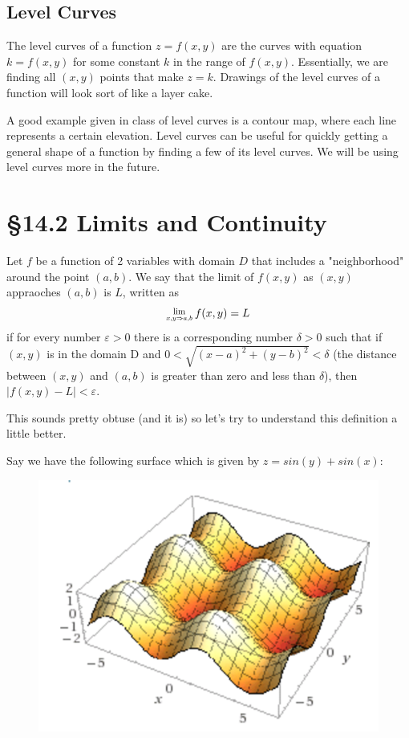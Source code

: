 \documentclass[12 pt]{article}
\begin{document}
        \subsection{Level Curves}

        \begin{def*}
            The level curves of a function $z=f(x,y)$ are the curves with equation $k=f(x,y)$ for some constant $k$ in the range of $f(x,y)$. Essentially, we are finding all $(x,y)$ points that make $z=k$. Drawings of the level curves of a function will look sort of like a layer cake.
        \end{def*}
        A good example given in class of level curves is a contour map, where each line represents a certain elevation. Level curves can be useful for quickly getting a general shape of a function by finding a few of its level curves. We will be using level curves more in the future.
    \section{\S 14.2 Limits and Continuity}
        \begin{def*}
            Let $f$ be a function of 2 variables with domain $D$ that includes a "neighborhood" around the point $(a,b)$. We say that the limit of $f(x,y)$ as $(x,y)$ appraoches $(a,b)$ is $L$, written as
            $$\Lim{x,y\Rightarrow a,b}f(x,y)=L$$
            if for every number $\varepsilon>0$ there is a corresponding number $\delta>0$ such that if $(x,y)$ is in the domain D and $0<\sqrt{(x-a)^2+(y-b)^2}<\delta$ (the distance between $(x,y)$ and $(a,b)$ is greater than zero and less than $\delta$), then $\lvert f(x,y)-L\rvert<\varepsilon$.
        \end{def*}

        This sounds pretty obtuse (and it is) so let's try to understand this definition a little better.

        Say we have the following surface which is given by $z=sin(y)+sin(x)$:
        \begin{figure}[!h]
            \centering
            \includegraphics{z=sin(y)+sin(x).png}
        \end{figure}
\end{document}
